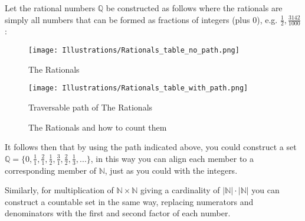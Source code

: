 Let the rational  numbers $\mathbb{Q}$ be constructed as follows where the rationals are simply all numbers that can be formed as fractions of integers (plus $0$), e.g. $\frac{1}{2}, \frac{3142}{1000}$:

\begin{figure}[H]
    \centering
    \begin{minipage}{0.45\textwidth}
        \centering
        \texttt{[image: Illustrations/Rationals\_table\_no\_path.png]}
        \caption{The Rationals}
        \label{fig:rationals_indicies_1}
    \end{minipage}
    \hfill
    \begin{minipage}{0.45\textwidth}
        \centering
        \texttt{[image: Illustrations/Rationals\_table\_with\_path.png]}
        \caption{Traversable path of The Rationals}
        \label{fig:rationals_indicies_2}
    \end{minipage}
    \caption{The Rationals and how to count them}
\end{figure}

It follows then that by using the path indicated above, you could construct a set $\mathbb{Q} = \{ 0, \frac{1}{1}, \frac{2}{1}, \frac{1}{2}, \frac{3}{1}, \frac{2}{2}, \frac{1}{3}, ...\}$, in this way you can align each member to a corresponding member of $\mathbb{N}$, just as you could with the integers. 
\bigskip

Similarly, for multiplication of $\mathbb{N} \times \mathbb{N}$ giving a cardinality of $\lvert{\mathbb{N}}\rvert \cdot \lvert{\mathbb{N}}\rvert$ you can construct a countable set in the same way, replacing numerators and denominators with the first and second factor of each number.

